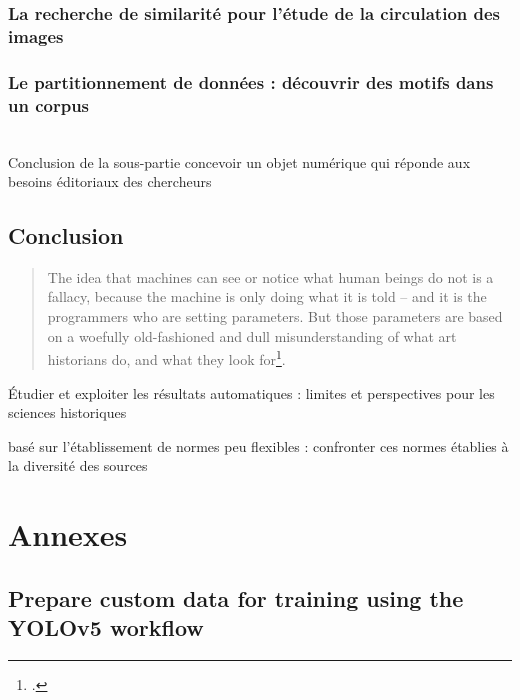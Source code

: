 \documentclass[a4paper,12pt,twoside]{book}
\newcommand{\clearemptydoublepage}{\newpage{\pagestyle{empty}\cleardoublepage}}
\newcommand\chapterNo[1]{
  \chapter*{#1}
  \markright{\MakeUppercase{#1}}
}
\begin{document}
                \section[La recherche de similarité]{La recherche de similarité pour l'étude de la circulation des images}
					

        		\section[Le partitionnement de données]{Le partitionnement de données : découvrir des motifs dans un corpus}
        			
        \\
        			
       	Conclusion de la sous-partie concevoir un objet numérique qui réponde aux besoins éditoriaux des chercheurs
        \clearemptydoublepage
    
    \chapterNo{Conclusion}
    
    \begin{quotation}
    	The idea that machines can see or notice what human beings do not is a fallacy, because the machine is only doing what it is told – and it is the programmers who are setting parameters. But those parameters are based on a woefully old-fashioned and dull misunderstanding of what art historians do, and what they look for\footcite{pollockComputersCanFind2014}.
    \end{quotation}
    Étudier et exploiter les résultats automatiques : limites et perspectives pour les sciences historiques
    
    basé sur l'établissement de normes peu flexibles : confronter ces normes établies à la diversité des sources
    
    
    \clearemptydoublepage
    
\appendix
    \part*{Annexes}	
    
    \chapter[Prepare custom data for training]{\label{YOLOv5Training}Prepare custom data for training using the YOLOv5 workflow}
	    
	    \clearemptydoublepage
\end{document}
